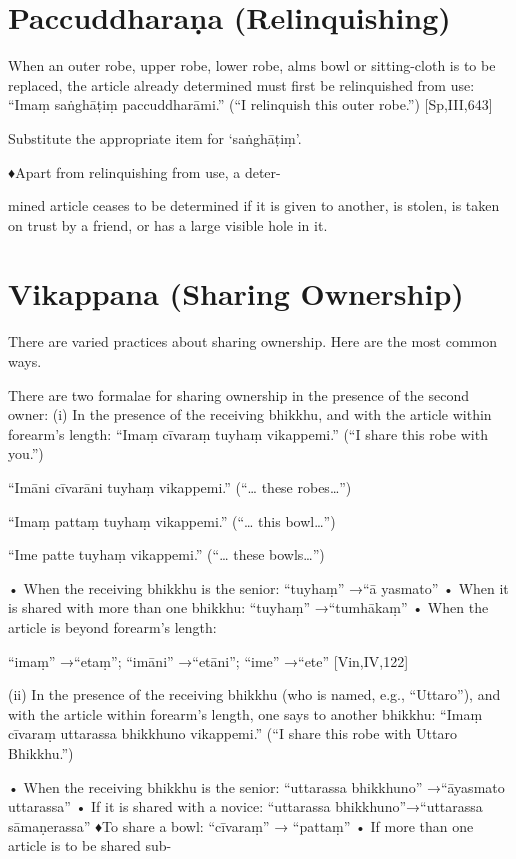 \section{Paccuddharaṇa (Relinquishing)}

When an outer robe, upper robe, lower robe,
alms bowl or sitting-cloth is to be replaced,
the article already determined must first be
relinquished from use:
“Imaṃ saṅghāṭiṃ paccuddharāmi.”
(“I relinquish this outer robe.”) [Sp,III,643]

Substitute the appropriate item for ‘saṅghāṭiṃ’.

♦Apart from relinquishing from use, a deter-

mined article ceases to be determined if it is
given to another, is stolen, is taken on trust by
a friend, or has a large visible hole in it.

\section{Vikappana (Sharing Ownership)}


There are varied practices about sharing ownership. Here are the most common
ways.

There are two formalae for sharing ownership
in the presence of the second owner:
(i) In the presence of the receiving bhikkhu,
and with the article within forearm’s length:
“Imaṃ cīvaraṃ tuyhaṃ vikappemi.”
(“I share this robe with you.”)

“Imāni cīvarāni tuyhaṃ vikappemi.”
(“… these robes…”)

“Imaṃ pattaṃ tuyhaṃ vikappemi.”
(“… this bowl…”)

“Ime patte tuyhaṃ vikappemi.”
(“… these bowls…”)

• When the receiving bhikkhu is the senior:
“tuyhaṃ” →“ā yasmato”
• When it is shared with more than one bhikkhu:
“tuyhaṃ” →“tumhākaṃ”
• When the article is beyond forearm’s length:

“imaṃ” →“etaṃ”; “imāni” →“etāni”;
“ime” →“ete”
[Vin,IV,122]

(ii) In the presence of the receiving bhikkhu
(who is named, e.g., “Uttaro”), and with the
article within forearm’s length, one says to
another bhikkhu:
“Imaṃ cīvaraṃ uttarassa bhikkhuno vikappemi.”
(“I share this robe with Uttaro Bhikkhu.”)

• When the receiving bhikkhu is the senior:
“uttarassa bhikkhuno” →“āyasmato uttarassa”
• If it is shared with a novice:
“uttarassa bhikkhuno”→“uttarassa sāmaṇerassa”
♦To share a bowl: “cīvaraṃ” → “pattaṃ”
• If more than one article is to be shared sub-

